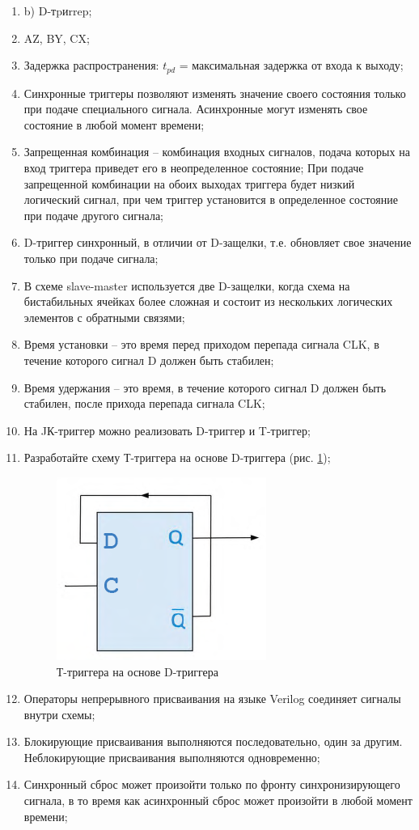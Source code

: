 \documentclass[a4paper,14pt]{article}
\begin{document}
\begin{enumerate}
	\item b) D-тpиrrep;
	\item AZ, BY, CX;
	\item Задержка распространения: $t_{pd}$ = максимальная задержка от входа к выходу;
	\item Синхронные триггеры позволяют изменять значение своего состояния только при подаче специального сигнала.
	Асинхронные могут изменять свое состояние в любой момент времени;
	\item Запрещенная комбинация -- комбинация входных сигналов, подача которых на вход триггера приведет его в неопределенное состояние;
	При подаче запрещенной комбинации на обоих выходах триггера будет низкий логический сигнал, при чем триггер установится в определенное состояние при подаче другого сигнала;
	\item D-триггер синхронный, в отличии от D-защелки, т.е. обновляет свое значение только при подаче сигнала;
	\item В схеме slave-master используется две D-защелки, когда схема на бистабильных ячейках более сложная и состоит из нескольких логических элементов с обратными связями;
	\item Время установки -- это время перед приходом перепада сигнала CLK, в течение которого сигнал D должен быть стабилен;
	\item Время удержания -- это время, в течение которого сигнал D должен быть стабилен, после прихода перепада сигнала CLK;
	\item На JК-триггер можно реализовать D-триггер и T-триггер;
	\item Разработайте схему Т-триггера на основе D-триггера (рис. \ref{fig:self_made_t_on_d});
	\begin{figure}[H]
		\centering
		\includegraphics[width=0.6\linewidth]{imgs/self_made_t_on_d}
		\caption{Т-триггера на основе D-триггера}
		\label{fig:self_made_t_on_d}
	\end{figure}
	\item Операторы непрерывного присваивания на языке Verilog соединяет сигналы внутри схемы;
	\item Блокирующие присваивания выполняются последовательно, один за другим.
	Неблокирующие присваивания выполняются одновременно;
	\item Синхронный сброс может произойти только по фронту синхронизирующего сигнала, в то время как асинхронный сброс может произойти в любой момент времени;


\end{enumerate}
\end{document}
